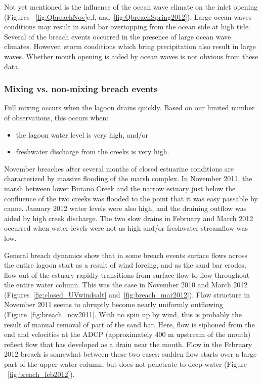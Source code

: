 Not yet mentioned is the influence of the ocean wave climate on the inlet opening (Figures ~\ref{fig:QbreachNov}e,f, and~\ref{fig:QbreachSpring2012}). Large ocean waves conditions may result in sand bar overtopping from the ocean side at high tide. Several of the breach events occurred in the presence of large ocean wave climates. However, storm conditions which bring precipitation also result in large waves. Whether mouth opening is aided by ocean waves is not obvious from these data. 

\subsubsection{Mixing vs. non-mixing breach events}

Full mixing occurs when the lagoon drains quickly. Based on our limited number of observations, this occurs when:
\begin{itemize}
	\item the lagoon water level is very high, and/or
	\item freshwater discharge from the creeks is very high.
\end{itemize}
November breaches after several months of closed estuarine conditions are characterized by massive flooding of the marsh complex. In November 2011, the marsh between lower Butano Creek and the narrow estuary just below the confluence of the two creeks was flooded to the point that it was easy passable by canoe. January 2012 water levels were also high, and the draining outflow was aided by high creek discharge. The two slow drains in February and March 2012 occurred when water levels were not as high and/or freshwater streamflow was low.

General breach dynamics show that in some breach events surface flows across the entire lagoon start as a result of wind forcing, and as the sand bar erodes, flow out of the estuary rapidly transitions from surface flow to flow throughout the entire water column. This was the case in November 2010 and March 2012 (Figures~\ref{fig:closed_UVwindsalt} and~\ref{fig:breach_mar2012}). Flow structure in November 2011 seems to abruptly become nearly uniformly outflowing (Figure~\ref{fig:breach_nov2011}. With no spin up by wind, this is probably the result of manual removal of part of the sand bar. Here, flow is siphoned from the end and velocities at the ADCP (approximately 400 m upstream of the mouth) reflect flow that has developed as a drain near the mouth. Flow in the February 2012 breach is somewhat between these two cases: sudden flow starts over a large part of the upper water column, but does not penetrate to deep water (Figure ~\ref{fig:breach_feb2012}). 


